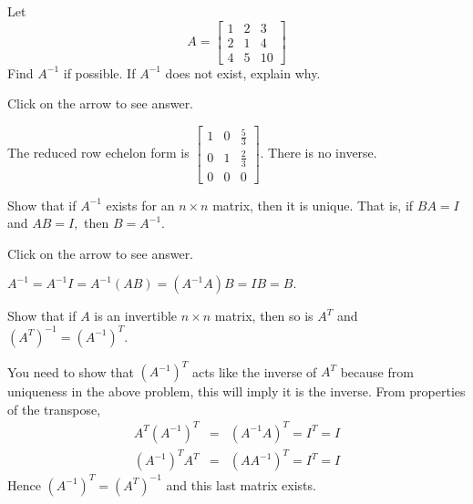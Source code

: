 \documentclass{ximera}
\begin{document}
\begin{problem}\label{prb:4.42}Let
\begin{equation*}
A=\left[
\begin{array}{rrr}
1 & 2 & 3 \\
2 & 1 & 4 \\
4 & 5 & 10
\end{array}
\right]
\end{equation*}
Find $A^{-1}$ if possible. If $A^{-1}$ does not exist, explain why.

Click on the arrow to see answer.
\begin{expandable}
The reduced row echelon form is
$\left[
\begin{array}{ccc}
1 & 0 &  \frac{5}{3} \\
0 & 1 &  \frac{2}{3} \\
0 & 0 & 0
\end{array}
\right]$. There is no inverse.
\end{expandable}
\end{problem}

\begin{problem}\label{prb:4.48}
Show that if $A^{-1}$ exists for an $n\times n$
matrix, then it is unique. That is, if $BA=I$ and $AB=I,$ then $B=A^{-1}.$

Click on the arrow to see answer.
\begin{expandable}
 $A^{-1}=A^{-1}I=A^{-1}\left( AB\right) =\left( A^{-1}A\right) B=IB=B.$
\end{expandable}
\end{problem}

\begin{problem}\label{prb:4.49}Show that if $A$ is an invertible $n\times n$ matrix, then so is
$A^{T} $ and $\left( A^{T}\right) ^{-1}=\left( A^{-1}\right) ^{T}.$
\begin{hint}
 You need to show that $\left( A^{-1}\right) ^{T}$ acts like the inverse of $A^{T}
$ because from uniqueness in the above problem, this will imply it is the
inverse. From properties of the transpose,
\begin{eqnarray*}
A^{T}\left( A^{-1}\right) ^{T} &=&\left( A^{-1}A\right) ^{T}=I^{T}=I \\
\left( A^{-1}\right) ^{T}A^{T} &=&\left( AA^{-1}\right) ^{T}=I^{T}=I
\end{eqnarray*}
Hence $\left( A^{-1}\right) ^{T}=\left( A^{T}\right) ^{-1}$ and this last
matrix exists.
\end{hint}
\end{problem}
\end{document}
